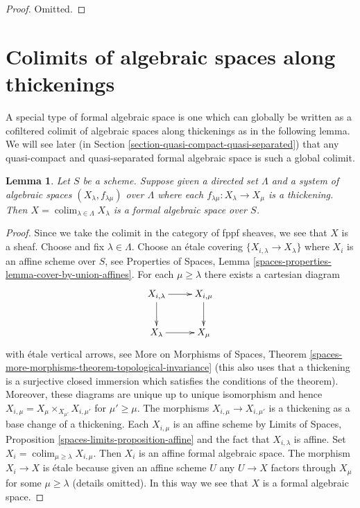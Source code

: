 \documentclass{stacks-project}
\theoremstyle{plain}
\newtheorem{lemma}[subsection]{Lemma}
\theoremstyle{definition}
\theoremstyle{remark}
\numberwithin{equation}{subsection}
\def\colim{\mathop{\mathrm{colim}}\nolimits}
\begin{document}
\begin{proof}
Omitted.
\end{proof}






\section{Colimits of algebraic spaces along thickenings}
\label{section-global-colimits}

\noindent
A special type of formal algebraic space is one which can globally
be written as a cofiltered colimit of algebraic spaces along
thickenings as in the following lemma. We will see later
(in Section \ref{section-quasi-compact-quasi-separated})
that any quasi-compact and quasi-separated formal algebraic space
is such a global colimit.

\begin{lemma}
\label{lemma-colimit-is-formal}
Let $S$ be a scheme. Suppose given a directed set
$\Lambda$ and a system of algebraic spaces $(X_\lambda, f_{\lambda \mu})$
over $\Lambda$ where each $f_{\lambda \mu} : X_\lambda \to X_\mu$ is a
thickening. Then $X = \colim_{\lambda \in \Lambda} X_\lambda$
is a formal algebraic space over $S$.
\end{lemma}

\begin{proof}
Since we take the colimit in the category of fppf sheaves, we
see that $X$ is a sheaf. Choose and fix $\lambda \in \Lambda$. Choose an
\'etale covering $\{X_{i, \lambda} \to X_\lambda\}$ where $X_i$ is an affine
scheme over $S$, see Properties of Spaces, Lemma
\ref{spaces-properties-lemma-cover-by-union-affines}.
For each $\mu \geq \lambda$ there exists a cartesian diagram
$$
\xymatrix{
X_{i, \lambda} \ar[r] \ar[d] & X_{i, \mu} \ar[d] \\
X_\lambda \ar[r] & X_\mu
}
$$
with \'etale vertical arrows, see
More on Morphisms of Spaces, Theorem
\ref{spaces-more-morphisms-theorem-topological-invariance}
(this also uses that a thickening is a surjective closed immersion which
satisfies the conditions of the theorem). Moreover, these diagrams are
unique up to unique isomorphism and hence
$X_{i, \mu} = X_\mu \times_{X_{\mu'}} X_{i, \mu'}$ for
$\mu' \geq \mu$. The morphisms $X_{i, \mu} \to X_{i, \mu'}$
is a thickening as a base change of a thickening. Each $X_{i, \mu}$
is an affine scheme by Limits of Spaces, Proposition
\ref{spaces-limits-proposition-affine} and the fact that
$X_{i, \lambda}$ is affine.
Set $X_i = \colim_{\mu \geq \lambda} X_{i, \mu}$. Then $X_i$ is
an affine formal algebraic space. The morphism $X_i \to X$
is \'etale because given an affine scheme $U$ any $U \to X$
factors through $X_\mu$ for some $\mu \geq \lambda$ (details omitted).
In this way we see that $X$ is a formal algebraic space.
\end{proof}
\end{document}
